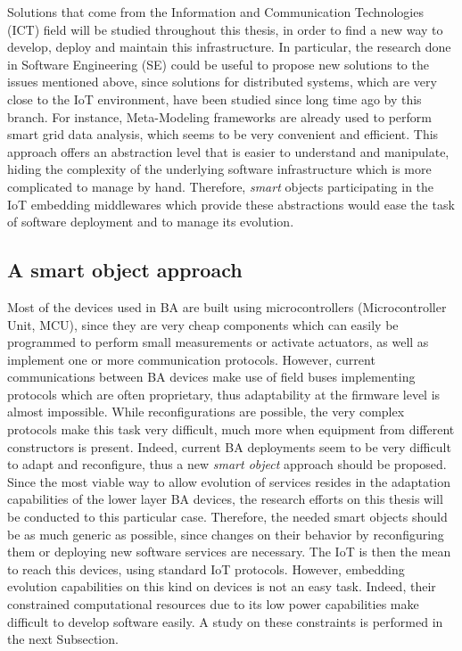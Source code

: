 Solutions that come from the Information and Communication Technologies (ICT) field will be studied throughout this thesis, in order to find a new way to develop, deploy and maintain this infrastructure.
In particular, the research done in Software Engineering (SE) could be useful to propose new solutions to the issues mentioned above, since solutions for distributed systems, which are very close to the IoT environment, have been studied since long time ago by this branch.
For instance, Meta-Modeling frameworks are already used to perform smart grid data analysis\cite{hartmann2014realisticsmartgrid}, which seems to be very convenient and efficient.
This approach offers an abstraction level that is easier to understand and manipulate, hiding the complexity of the underlying software infrastructure which is more complicated to manage by hand.
Therefore, \textit{smart} objects participating in the IoT embedding middlewares which provide these abstractions would ease the task of software deployment and to manage its evolution.

\subsection{A smart object approach}
\label{subsec:smartObjects}
Most of the devices used in BA are built using microcontrollers (Microcontroller Unit, MCU), since they are very cheap components which can easily be programmed to perform small measurements or activate actuators, as well as implement one or more communication protocols.
However, current communications between BA devices make use of field buses implementing protocols which are often proprietary, thus adaptability at the firmware level is almost impossible.
While reconfigurations are possible, the very complex protocols make this task very difficult, much more when equipment from different constructors is present.
Indeed, current BA deployments seem to be very difficult to adapt and reconfigure, thus a new \textit{smart object} approach should be proposed.
Since the most viable way to allow evolution of services resides in the adaptation capabilities of the lower layer BA devices, the research efforts on this thesis will be conducted to this particular case.
Therefore, the needed smart objects should be as much generic as possible, since changes on their behavior by reconfiguring them or deploying new software services are necessary.
The IoT is then the mean to reach this devices, using standard IoT protocols.
However, embedding evolution capabilities on this kind on devices is not an easy task.
Indeed, their constrained computational resources due to its low power capabilities make difficult to develop software easily.
A study on these constraints is performed in the next Subsection.


